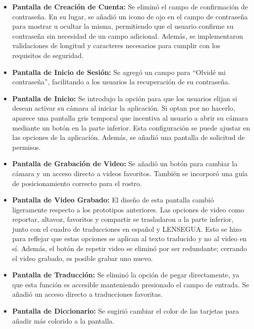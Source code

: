\begin{itemize}
    \item \textbf{Pantalla de Creación de Cuenta:} Se eliminó el campo de confirmación de contraseña. En su lugar, se añadió un icono de ojo en el campo de contraseña para mostrar u ocultar la misma, permitiendo que el usuario confirme su contraseña sin necesidad de un campo adicional. Además, se implementaron validaciones de longitud y caracteres necesarios para cumplir con los requisitos de seguridad.
    
    \item \textbf{Pantalla de Inicio de Sesión:} Se agregó un campo para ``Olvidé mi contraseña'', facilitando a los usuarios la recuperación de su contraseña.
    
    \item \textbf{Pantalla de Inicio:} Se introdujo la opción para que los usuarios elijan si desean activar su cámara al iniciar la aplicación. Si optan por no hacerlo, aparece una pantalla gris temporal que incentiva al usuario a abrir su cámara mediante un botón en la parte inferior. Esta configuración se puede ajustar en las opciones de la aplicación. Además, se añadió una pantalla de solicitud de permisos.
    
    \item \textbf{Pantalla de Grabación de Video:} Se añadió un botón para cambiar la cámara y un acceso directo a videos favoritos. También se incorporó una guía de posicionamiento correcto para el rostro.
    
    \item \textbf{Pantalla de Video Grabado:} El diseño de esta pantalla cambió ligeramente respecto a los prototipos anteriores. Las opciones de video como reportar, altavoz, favoritos y compartir se trasladaron a la parte inferior, junto con el cuadro de traducciones en español y LENSEGUA. Esto se hizo para reflejar que estas opciones se aplican al texto traducido y no al video en sí. Además, el botón de repetir video se eliminó por ser redundante; cerrando el video grabado, es posible grabar uno nuevo.
    
    \item \textbf{Pantalla de Traducción:} Se eliminó la opción de pegar directamente, ya que esta función es accesible manteniendo presionado el campo de entrada. Se añadió un acceso directo a traducciones favoritas.
    
    \item \textbf{Pantalla de Diccionario:} Se sugirió cambiar el color de las tarjetas para añadir más colorido a la pantalla.
    

\end{itemize}
